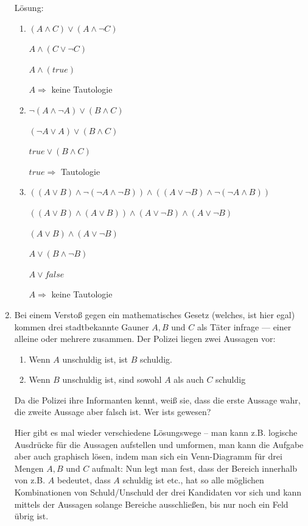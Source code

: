 \documentclass[main.tex]{subfiles}
\begin{document}
\begin{enumerate}
	      Lösung:
	      \begin{enumerate}
		      \item \( (A \land C) \lor (A \land \neg C) \)

		            \( A \land (C \lor \neg C ) \)

		            \( A \land (true) \)

		            \( A  \Rightarrow \)  keine Tautologie
		      \item \( \neg (A \land \neg A) \lor (B \land C) \)

		            \( (\neg A \lor A )  \lor ( B \land C ) \)


		            \( true \lor ( B \land C ) \)

		            \( true \Rightarrow \) Tautologie
		      \item \( ((A \lor B) \land \neg (\neg A \land \neg B)) \land
		            ((A \lor \neg B) \land \neg (\neg A \land B)) \)

		            \( ((A \lor B) \land (A \lor B)) \land
		            (A \lor \neg B) \land (A \lor \neg B) \)

		            \( (A \lor B) \land (A \lor \neg B) \)

		            \( A \lor (B \land \neg B) \)

		            \( A \lor false \)

		            \( A \Rightarrow \) keine Tautologie
	      \end{enumerate}
	\item Bei einem Verstoß gegen ein mathematisches Gesetz (welches, ist hier egal)
	      kommen drei stadtbekannte Gauner \( A, B \) und \( C \) als Täter infrage — einer alleine oder mehrere zusammen.
	      Der Polizei liegen zwei Aussagen vor:
	      \begin{enumerate}
		      \item Wenn \( A \) unschuldig ist, ist \( B \) schuldig.
		      \item Wenn \( B \) unschuldig ist, sind sowohl \( A \) als auch \( C \) schuldig
	      \end{enumerate}
	      Da die Polizei ihre Informanten kennt, weiß sie, dass die erste Aussage wahr,
	      die zweite Aussage aber falsch ist. Wer ists gewesen?

	      Hier gibt es mal wieder verschiedene Lösungswege – man kann z.B. logische Ausdrücke
	      für die Aussagen aufstellen und umformen, man kann die Aufgabe aber auch graphisch lösen,
	      indem man sich ein Venn-Diagramm für drei Mengen \( A, B \) und \( C \) aufmalt:
	      Nun legt man fest, dass der Bereich innerhalb von z.B. \( A \) bedeutet, dass \( A \)
	      schuldig ist etc., hat so alle möglichen Kombinationen von Schuld/Unschuld
	      der drei Kandidaten vor sich und kann mittels der Aussagen solange Bereiche ausschließen,
	      bis nur noch ein Feld übrig ist.


\end{enumerate}
\end{document}

